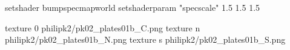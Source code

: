 setshader bumpspecmapworld
setshaderparam "specscale" 1.5 1.5 1.5

texture 0 philipk2/pk02_plates01b_C.png
texture n philipk2/pk02_plates01b_N.png
texture s philipk2/pk02_plates01b_S.png

